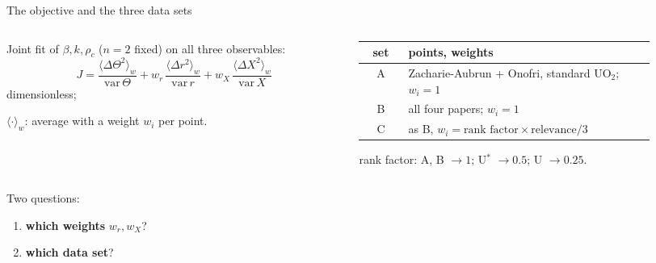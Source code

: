 \documentclass[10pt,aspectratio=169]{beamer}
\begin{document}
\begin{frame}{The objective and the three data sets}
  \begin{columns}[T]
    \begin{column}{0.5\textwidth}
      Joint fit of $\beta, k, \rho_c$ ($n = 2$ fixed) on all three observables:
      \[ J = \frac{\langle \Delta\Theta^2\rangle_w}{\mathrm{var}\,\Theta}
           + w_r\,\frac{\langle \Delta r^2\rangle_w}{\mathrm{var}\,r}
           + w_X\,\frac{\langle \Delta X^2\rangle_w}{\mathrm{var}\,X} \]
      \footnotesize
      dimensionless; 
      
      $\langle\cdot\rangle_w$: average with a weight $w_i$ per point.
    \end{column}
    \begin{column}{0.48\textwidth}
      \small
      \begin{tabular}{cp{0.85\linewidth}}
        \toprule
        set & points, weights \\
        \midrule
        A & Zacharie-Aubrun + Onofri, standard UO$_2$; $w_i = 1$ \\
        B & all four papers; $w_i = 1$ \\
        C & as B, $w_i = \text{rank factor}\times\text{relevance}/3$ \\
        \bottomrule
      \end{tabular}

      \vspace{0.4em}
      \footnotesize
      rank factor: A, B $\to 1$; U$^*$ $\to 0.5$; U $\to 0.25$.
    \end{column}
  \end{columns}

  \vspace{0.6em}
  \small
  Two questions:
  \begin{enumerate}
    \item \textbf{which weights} $w_r, w_X$? 
    \item \textbf{which data set}? 
  \end{enumerate}
\end{frame}
\end{document}
